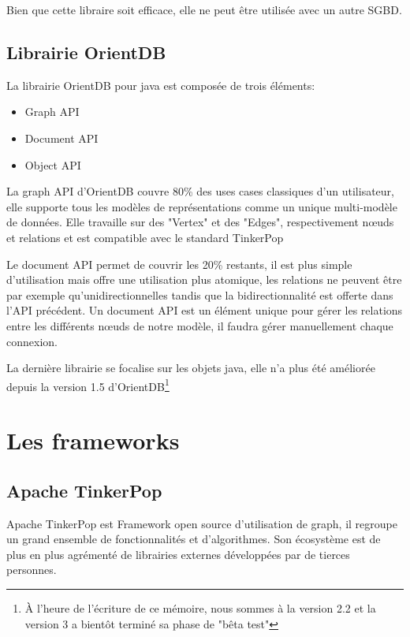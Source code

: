 \documentclass[a4paper,fleqn,12pt]{report}
\begin{document}
Bien que cette libraire soit efficace, elle ne peut être utilisée avec un autre SGBD. 

\subsection{Librairie OrientDB}

La librairie OrientDB pour java est composée de trois éléments:

\begin{itemize}
\item Graph API
\item Document API
\item Object API
\end{itemize}

La graph API d’OrientDB couvre 80\% des uses cases classiques d’un utilisateur, elle supporte tous les modèles de représentations comme un unique multi-modèle de données. Elle travaille sur des "Vertex" et des "Edges", respectivement nœuds et relations et est compatible avec le standard TinkerPop

Le document API permet de couvrir les 20\% restants, il est plus simple d’utilisation mais offre une utilisation plus atomique, les relations ne peuvent être par exemple qu’unidirectionnelles tandis que la bidirectionnalité est offerte dans l’API précédent. Un document API est un élément unique pour gérer les relations entre les différents nœuds de notre modèle, il faudra gérer manuellement chaque connexion.

La dernière librairie se focalise sur les objets java, elle n'a plus été améliorée depuis la version 1.5 d'OrientDB\footnote{À l'heure de l'écriture de ce mémoire, nous sommes à la version 2.2 et la version 3 a bientôt terminé sa phase de "bêta test"}

\section{Les frameworks}

\subsection{Apache TinkerPop}

Apache TinkerPop est Framework open source d’utilisation de graph, il regroupe un grand ensemble de fonctionnalités et d’algorithmes. Son écosystème est de plus en plus agrémenté de librairies externes développées par de tierces personnes.
\end{document}
